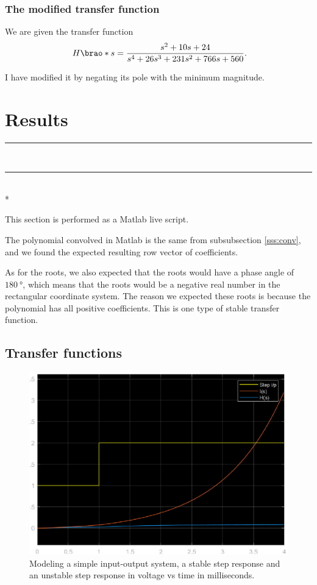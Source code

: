 \documentclass[12pt]{article}
\DeclarePairedDelimiter\brao()%
\def\hr{{\par\noindent\rule{\textwidth}{0.4pt}}}
\begin{document}
\subsubsection{The modified transfer function}

We are given the transfer function
\[
    H\brao*s = \frac{s^2 + 10s + 24}{s^4 + 26s^3 + 231s^2 + 766s + 560}\rlap.
\]

I have modified it by negating its pole with the minimum magnitude.

\section{Results}

\hr



\ \hr \\*

This section is performed as a Matlab live script.

The polynomial convolved in Matlab is the same from subsubsection \ref{sss:conv}, and we found the expected resulting row vector of coefficients.

As for the roots, we also expected that the roots would have a phase angle of $\SI{180}\degree$,
which means that the roots would be a negative real number in the rectangular coordinate system.
The reason we expected these roots is because the polynomial has all positive coefficients.
This is one type of stable transfer function.

\subsection{Transfer functions}

\begin{figure}
    \centering
    \includegraphics[width=\linewidth]{transfer_functions.eps}
    \caption{Modeling a simple input-output system, a stable step response and an unstable step response in voltage vs time in milliseconds.}
    \label{fig:transfer functions}
\end{figure}
\end{document}
